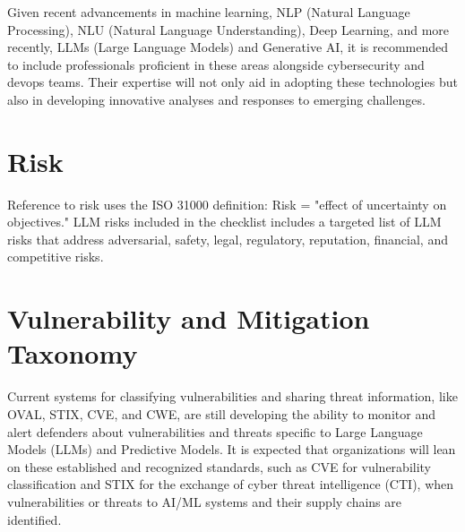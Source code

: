 Given recent advancements in machine learning, NLP (Natural Language Processing), NLU (Natural Language Understanding), Deep Learning, and more recently, LLMs (Large Language Models) and Generative AI, it is recommended to include professionals proficient in these areas alongside cybersecurity and devops teams. Their expertise will not only aid in adopting these technologies but also in developing innovative analyses and responses to emerging challenges.


\clearpage

\section{Risk}
Reference to risk uses the ISO 31000 definition: Risk = "effect of uncertainty on objectives." LLM risks included in the checklist includes a targeted list of LLM risks that address adversarial, safety, legal, regulatory, reputation, financial, and competitive risks.

\section{Vulnerability and Mitigation Taxonomy}
Current systems for classifying vulnerabilities and sharing threat information, like OVAL, STIX, CVE, and CWE, are still developing the ability to monitor and alert defenders about vulnerabilities and threats specific to Large Language Models (LLMs) and Predictive Models. It is expected that organizations will lean on these established and recognized standards, such as CVE for vulnerability classification and STIX for the exchange of cyber threat intelligence (CTI), when vulnerabilities or threats to AI/ML systems and their supply chains are identified.
